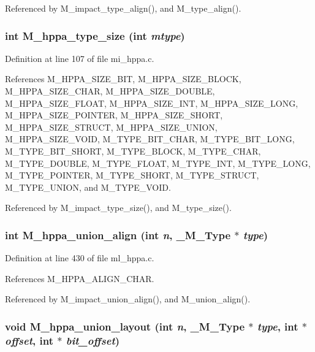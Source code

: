 Referenced by M\_\-impact\_\-type\_\-align(), and M\_\-type\_\-align().
\subsubsection{\setlength{\rightskip}{0pt plus 5cm}int M\_\-hppa\_\-type\_\-size (int {\em mtype})}\label{m__hppa_8h_31993e4bb89ce0231d90ceb9d92160ba}




Definition at line 107 of file mi\_\-hppa.c.

References M\_\-HPPA\_\-SIZE\_\-BIT, M\_\-HPPA\_\-SIZE\_\-BLOCK, M\_\-HPPA\_\-SIZE\_\-CHAR, M\_\-HPPA\_\-SIZE\_\-DOUBLE, M\_\-HPPA\_\-SIZE\_\-FLOAT, M\_\-HPPA\_\-SIZE\_\-INT, M\_\-HPPA\_\-SIZE\_\-LONG, M\_\-HPPA\_\-SIZE\_\-POINTER, M\_\-HPPA\_\-SIZE\_\-SHORT, M\_\-HPPA\_\-SIZE\_\-STRUCT, M\_\-HPPA\_\-SIZE\_\-UNION, M\_\-HPPA\_\-SIZE\_\-VOID, M\_\-TYPE\_\-BIT\_\-CHAR, M\_\-TYPE\_\-BIT\_\-LONG, M\_\-TYPE\_\-BIT\_\-SHORT, M\_\-TYPE\_\-BLOCK, M\_\-TYPE\_\-CHAR, M\_\-TYPE\_\-DOUBLE, M\_\-TYPE\_\-FLOAT, M\_\-TYPE\_\-INT, M\_\-TYPE\_\-LONG, M\_\-TYPE\_\-POINTER, M\_\-TYPE\_\-SHORT, M\_\-TYPE\_\-STRUCT, M\_\-TYPE\_\-UNION, and M\_\-TYPE\_\-VOID.

Referenced by M\_\-impact\_\-type\_\-size(), and M\_\-type\_\-size().
\subsubsection{\setlength{\rightskip}{0pt plus 5cm}int M\_\-hppa\_\-union\_\-align (int {\em n}, \bf{\_\-M\_\-Type} $\ast$ {\em type})}\label{m__hppa_8h_de73701883cf19da60efc9b25e2781da}




Definition at line 430 of file ml\_\-hppa.c.

References M\_\-HPPA\_\-ALIGN\_\-CHAR.

Referenced by M\_\-impact\_\-union\_\-align(), and M\_\-union\_\-align().
\subsubsection{\setlength{\rightskip}{0pt plus 5cm}void M\_\-hppa\_\-union\_\-layout (int {\em n}, \bf{\_\-M\_\-Type} $\ast$ {\em type}, int $\ast$ {\em offset}, int $\ast$ {\em bit\_\-offset})}\label{m__hppa_8h_c32cc61bf1f33e5597224a4695b06820}





